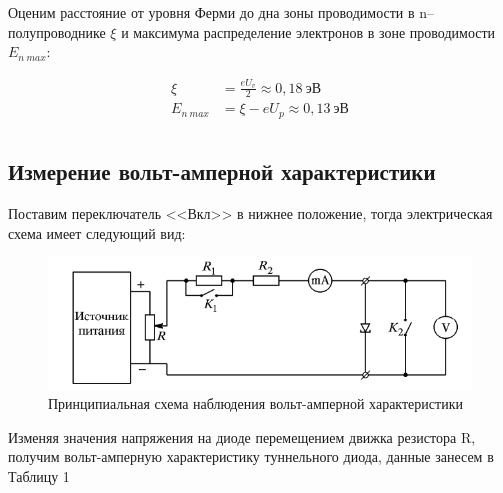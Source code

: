 \documentclass[a4paper,12pt]{article}
\begin{document}
Оценим расстояние от уровня Ферми до дна зоны проводимости в n--полупроводнике $\xi$ и максимума распределение электронов в зоне проводимости $E_{n \ max}$:

\begin{align*}
	\xi &= \frac{eU_v}{2} \approx 0,18 \ эВ \\
	E_{n \ max} &= \xi - eU_p \approx 0,13 \ эВ \\
\end{align*}

\subsection*{Измерение вольт-амперной характеристики}

Поставим переключатель <<Вкл>> в нижнее положение, тогда электрическая схема имеет следующий вид:

\begin{figure}[h!]
	\centering
	\includegraphics[width=\linewidth]{scheme_1}
	\caption{Принципиальная схема наблюдения вольт-амперной характеристики}
\end{figure}

Изменяя значения напряжения на диоде перемещением движка резистора R, получим вольт-амперную характеристику туннельного диода, данные занесем в Таблицу 1 
\end{document}
